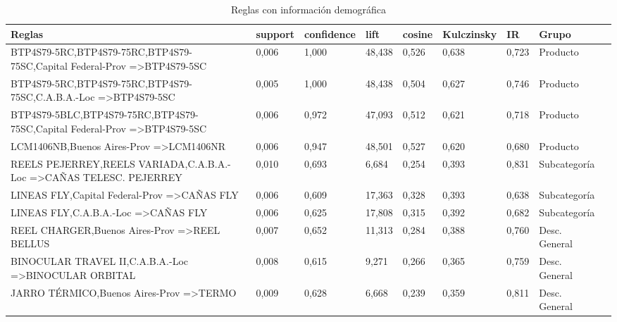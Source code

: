 \documentclass[]{article}
\begin{document}
 \begin{landscape}
 	\begin{table}[h]
 		\centering
 		\caption{Reglas con información demográfica}
 		\label{Tab_Reg_Demog}
 		\begin{tabular}{lllllllll}
 			\textbf{Reglas}                                     & \textbf{support} & \textbf{confidence}& \textbf{lift} & \textbf{cosine}  & \textbf{Kulczinsky}  & \textbf{IR} & \textbf{Grupo}                &  \\
 			\hline
 			BTP4S79-5RC,BTP4S79-75RC,BTP4S79-75SC,Capital Federal-Prov =\textgreater BTP4S79-5SC  & 0,006   & 1,000      & 48,438 & 0,526  & 0,638      & 0,723 & Producto            &  \\
 			BTP4S79-5RC,BTP4S79-75RC,BTP4S79-75SC,C.A.B.A.-Loc =\textgreater BTP4S79-5SC          & 0,005   & 1,000      & 48,438 & 0,504  & 0,627      & 0,746 & Producto            &  \\
 			BTP4S79-5BLC,BTP4S79-75RC,BTP4S79-75SC,Capital Federal-Prov =\textgreater BTP4S79-5SC & 0,006   & 0,972      & 47,093 & 0,512  & 0,621      & 0,718 & Producto            &  \\
 			LCM1406NB,Buenos Aires-Prov =\textgreater LCM1406NR                                   & 0,006   & 0,947      & 48,501 & 0,527  & 0,620      & 0,680 & Producto            &  \\
 			REELS PEJERREY,REELS VARIADA,C.A.B.A.-Loc =\textgreater CAÑAS TELESC. PEJERREY        & 0,010   & 0,693      & 6,684  & 0,254  & 0,393      & 0,831 & Subcategoría        &  \\
 			LINEAS FLY,Capital Federal-Prov =\textgreater CAÑAS FLY                               & 0,006   & 0,609      & 17,363 & 0,328  & 0,393      & 0,638 & Subcategoría        &  \\
 			LINEAS FLY,C.A.B.A.-Loc =\textgreater CAÑAS FLY                                       & 0,006   & 0,625      & 17,808 & 0,315  & 0,392      & 0,682 & Subcategoría        &  \\
 			REEL CHARGER,Buenos Aires-Prov =\textgreater REEL BELLUS                              & 0,007   & 0,652      & 11,313 & 0,284  & 0,388      & 0,760 & Desc. General &  \\
 			BINOCULAR TRAVEL II,C.A.B.A.-Loc =\textgreater BINOCULAR ORBITAL                      & 0,008   & 0,615      & 9,271  & 0,266  & 0,365      & 0,759 & Desc. General &  \\
 			JARRO TÉRMICO,Buenos Aires-Prov =\textgreater TERMO                                   & 0,009   & 0,628      & 6,668  & 0,239  & 0,359      & 0,811 & Desc. General &  \\

\end{tabular}
\end{table}
\end{landscape}
\end{document}
